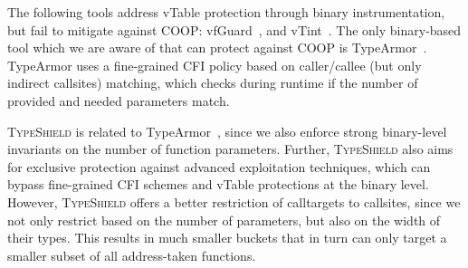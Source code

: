 The following tools address vTable protection through binary instrumentation, but fail to mitigate against COOP: vfGuard~\cite{vfuard:aravind}, and vTint~\cite{vtint:zhang}. The only binary-based tool which we are aware of that can protect against COOP is TypeArmor~\cite{veen:typearmor}. TypeArmor uses a fine-grained CFI policy based on caller/callee (but only indirect callsites) matching, which checks during runtime if the number of provided and needed parameters match.

\textsc{TypeShield} is related to TypeArmor~\cite{veen:typearmor}, since we also enforce strong binary-level invariants on the number of function parameters. Further, \textsc{TypeShield} also aims for exclusive protection against advanced exploitation techniques, which can bypass fine-grained CFI schemes and vTable protections at the binary level. However, \textsc{TypeShield} offers a better restriction of calltargets to callsites, since we not only restrict based on the number of parameters, but also on the width of their types. This results in much smaller buckets that in turn can only target a smaller subset of all address-taken functions. %

% 

